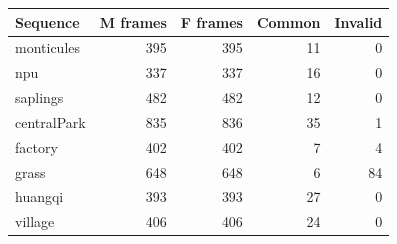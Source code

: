 \begin{tabular}{lrrrr}
\toprule
Sequence & M frames & F frames & Common & Invalid \\
\midrule
monticules & 395 & 395 & 11 & 0 \\
npu & 337 & 337 & 16 & 0 \\
saplings & 482 & 482 & 12 & 0 \\
centralPark & 835 & 836 & 35 & 1 \\
factory & 402 & 402 & 7 & 4 \\
grass & 648 & 648 & 6 & 84 \\
huangqi & 393 & 393 & 27 & 0 \\
village & 406 & 406 & 24 & 0 \\
\bottomrule
\end{tabular}
